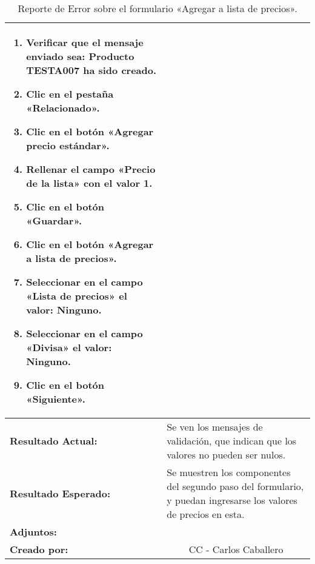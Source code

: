 \begin{table}[H]
\begin{tabular}{|p{2.5cm}|p{2.8cm}|p{2.2cm}|p{2.8cm}|p{2.2cm}|}
{{\begin{enumerate}
\item Verificar que el mensaje enviado sea:
    \textbf{Producto TESTA007 ha sido creado}.
\item Clic en el pestaña «Relacionado».
\item Clic en el botón «Agregar precio estándar».
\item Rellenar el campo «Precio de la lista» con el valor \textbf{1}.
\item Clic en el botón «Guardar».
\item Clic en el botón «Agregar a lista de precios».
\item Seleccionar en el campo «Lista de precios» el valor: \textbf{Ninguno}.
\item Seleccionar en el campo «Divisa» el valor: \textbf{Ninguno}.
\item Clic en el botón «Siguiente».
\end{enumerate}
}} \\
\hline
\footnotesize{\textbf{Resultado Actual:}} &
\multicolumn{4}{p{12.4cm}|}{\footnotesize{Se ven los mensajes de validación,
que indican que los valores no pueden ser nulos.}} \\
\hline
\footnotesize{\textbf{Resultado Esperado:}} &
\multicolumn{4}{p{12.4cm}|}{\footnotesize{Se muestren los componentes del
segundo paso del formulario, y puedan ingresarse los valores de precios en esta.
}} \\
\hline
\footnotesize{\textbf{Adjuntos:}} &
\multicolumn{4}{p{12.4cm}|}{\footnotesize{}} \\
\hline
\footnotesize{\textbf{Creado por:}} &
\multicolumn{4}{c|}{\footnotesize{CC - Carlos Caballero}} \\
\hline
\end{tabular}
\caption{Reporte de Error sobre el formulario «Agregar a lista de precios».}
\label{br}
\end{table}

